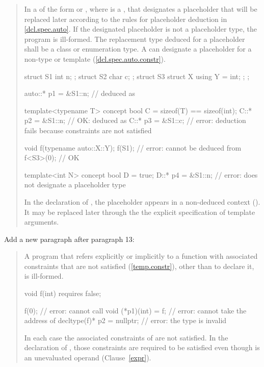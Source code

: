 \begin{quote}
\setcounter{Paras}{11}
\pnum
In a  of the form  or
, where  is a ,
that  designates a placeholder that 
will be replaced later according to the rules for placeholder deduction in
\ref{dcl.spec.auto}.
%
If the designated placeholder is not a placeholder type, the program is
ill-formed.
% 
The replacement type deduced for a placeholder shall be a class or
enumeration type.
% 
\enternote
A  can designate a placeholder for
a non-type or template (\ref{dcl.spec.auto.constr}).
\exitnote
% 
\enterexample
\begin{codeblock}
struct S1 { int n; };
struct S2 { char c; };
struct S3 { struct X { using Y = int; }; };

auto::* p1 = &S1::n; //  deduced as 

template<typename T> concept bool C = sizeof(T) == sizeof(int);
C::* p2 = &S1::n; // OK:  deduced as 
C::* p3 = &S1::c; // error: deduction fails because constraints are not satisfied

void f(typename auto::X::Y);
f(S1);    // error:  cannot be deduced from 
f<S3>(0); // OK

template<int N> concept bool D = true;
D::* p4 = &S1::n; // error:  does not designate a placeholder type
\end{codeblock}
In the declaration of , the placeholder appears in a non-deduced 
context (). It may be replaced later through the
the explicit specification of template arguments.
\exitexample
\end{quote}

Add a new paragraph after paragraph 13:

\begin{quote}
\setcounter{Paras}{13}
\pnum
A program that refers explicitly or implicitly to a function with associated 
constraints that are not satisfied (\ref{temp.constr}), other than to declare 
it, is ill-formed.
% 
\enterexample
\begin{codeblock}
void f(int) requires false;

f(0);                      // error: cannot call 
void (*p1)(int) = f;       // error: cannot take the address of 
decltype(f)* p2 = nullptr; // error: the type  is invalid
\end{codeblock}
In each case the associated constraints of  are not satisfied. In the 
declaration of , those constraints are required to be satisfied even 
though  is an unevaluated operand (Clause~\ref{expr}).
\exitexample
\end{quote}


